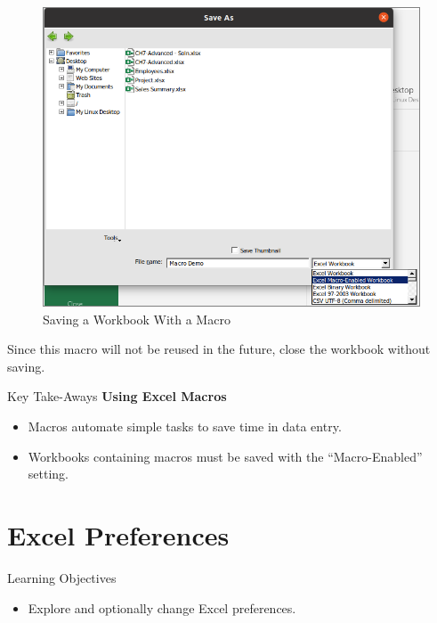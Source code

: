 \begin{figure}[H]
	\centering
	\includegraphics[width=\maxwidth{.95\linewidth}]{gfx/ch09_fig67}
	\caption{Saving a Workbook With a Macro}
	\label{09:fig67}
\end{figure}

Since this macro will not be reused in the future, close the workbook without saving.

\begin{center}
	\begin{tkwbox}{Key Take-Aways}
		\textbf{Using Excel Macros}
		\\
		\begin{itemize}
			\setlength{\itemsep}{0pt}
			\setlength{\parskip}{0pt}
			\setlength{\parsep}{0pt}
			
			\item Macros automate simple tasks to save time in data entry.
			\item Workbooks containing macros must be saved with the ``Macro-Enabled'' setting.
			
		\end{itemize}
	\end{tkwbox}
\end{center}

\section{Excel Preferences}

\begin{center}
	\begin{objbox}{Learning Objectives}
		\begin{itemize}
			\setlength{\itemsep}{0pt}
			\setlength{\parskip}{0pt}
			\setlength{\parsep}{0pt}
			
			\item Explore and optionally change Excel preferences.
			
		\end{itemize}
	\end{objbox}
\end{center}

